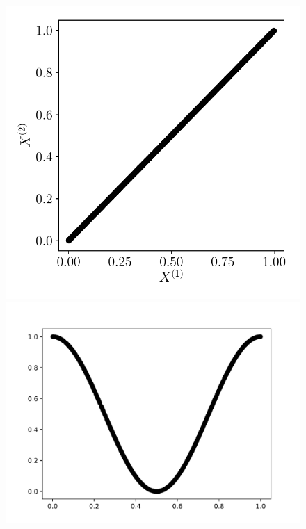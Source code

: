 \begin{figure}
	\begin{minipage}{\textwidth}
		\begin{minipage}{0.33\textwidth}
			\includegraphics[width=\textwidth]{2som_id_in.pdf}
		\end{minipage}
		\begin{minipage}{0.33\textwidth}
			\includegraphics[width=\textwidth]{2som_courbe000_inputs.pdf}
		\end{minipage}

\end{minipage}
\end{figure}
